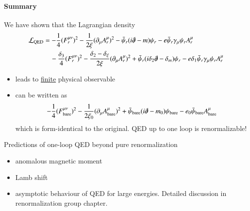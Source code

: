 \paragraph{Summary}
We have shown that the Lagrangian density
\begin{align*}
   \mathcal{L}_{\text{QED}} &= - \frac{1}{4} (F_r^{\mu\nu})^2 - \frac{1}{2\xi} (\partial_\mu A_r^\mu)^2 - \bar\psi_r (i \slashed{\partial} - m) \psi_r - e \bar\psi_r \gamma_\mu \psi_r A_r^\mu \\
   &\quad- \frac{\delta_3}{4} (F_r^{\mu\nu})^2 - \frac{\delta_2 - \delta_\xi}{2 \xi} (\partial_\mu A^\mu_r)^2 + \bar\psi_r (i\delta_2 \slashed{\partial} - \delta_m) \psi_r - e \delta_1 \bar\psi_r \gamma_\mu \psi_r A_r^\mu 
\end{align*}
\begin{itemize}
   \item leads to \underline{finite} physical observable 
   \item can be written as
      \begin{align}
         -\frac{1}{4} (F_\text{bare}^{\mu\nu})^2 - \frac{1}{2\xi_0} (\partial_\mu A^\mu_\text{bare})^2 + \bar\psi_{\text{bare}} (i \slashed{\partial} - m_0) \psi_{\text{bare}} - e_0 \bar\psi_{\text{bare}} A^\mu_\text{bare}
      \end{align}
      which is form-identical to the original. QED up to one loop is renormalizable!
\end{itemize}

Predictions of one-loop QED beyond pure renormalization
\begin{itemize}
   \item anomalous magnetic moment 
   \item Lamb shift
   \item asymptotic behaviour of QED for large energies. Detailed discussion in renormalization group chapter.
\end{itemize}
